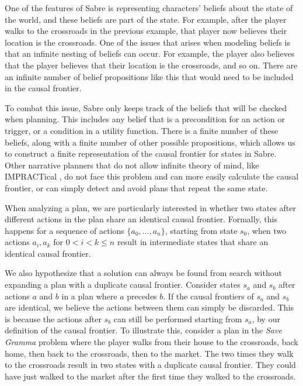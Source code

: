 \documentclass[letterpaper]{article} %
\begin{document}
One of the features of Sabre is representing characters' beliefs about the state of the world, and these beliefs are part of the state. For example, after the player walks to the crossroads in the previous example, that player now believes their location is the crossroads. One of the issues that arises when modeling beliefs is that an infinite nesting of beliefs can occur. For example, the player also believes that the player believes that their location is the crossroads, and so on. There are an infinite number of belief propositions like this that would need to be included in the causal frontier.

To combat this issue, Sabre only keeps track of the beliefs that will be checked when planning. This includes any belief that is a precondition for an action or trigger, or a condition in a utility function. There is a finite number of these beliefs, along with a finite number of other possible propositions, which allows us to construct a finite representation of the causal frontier for states in Sabre. Other narrative planners that do not allow infinite theory of mind, like IMPRACTical \cite{teutenberg2015incorporating}, do not face this problem and can more easily calculate the causal frontier, or can simply detect and avoid plans that repeat the same state.

When analyzing a plan, we are particularly interested in whether two states after different actions in the plan share an identical causal frontier. Formally, this happens for a sequence of actions $\{a_0, \ldots, a_n\}$, starting from state $s_0$, when two actions $a_i, a_k$ for $0 < i < k \leq n$ result in intermediate states that share an identical causal frontier.

We also hypothesize that a solution can always be found from search without expanding a plan with a duplicate causal frontier. Consider states $s_a$ and $s_b$ after actions $a$ and $b$ in a plan where $a$ precedes $b$. If the causal frontiers of $s_a$ and $s_b$ are identical, we believe the actions between them can simply be discarded. This is because the actions after $s_b$ can still be performed starting from $s_a$, by our definition of the causal frontier. To illustrate this, consider a plan in the \textit{Save Gramma} problem where the player walks from their house to the crossroads, back home, then back to the crossroads, then to the market. The two times they walk to the crossroads result in two states with a duplicate causal frontier. They could have just walked to the market after the first time they walked to the crossroads.
\end{document}

